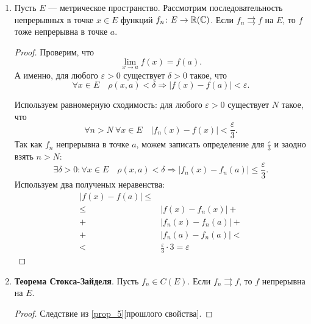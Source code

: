 \begin{prop}
\begin{enumerate}
\begin{proof}
\begin{description}
			Устремим $ m \to  \infty$. Тогда \[
			    \lvert f_n(x) - f(x) \rvert \le  \varepsilon 
			.\] 
			По определению равномерной сходимости получаем, что $ f_n \rightrightarrows f$ на $ E$.
	        \end{description} 
	    \end{proof}
	\item \label{prop_5} Пусть $ E$ --- метрическое пространство. Рассмотрим последовательность непрерывных в точке $ x \in E$ функций $ f_n \colon E \to \mathbb{R}(\mathbb{C}) $. Если $ f_n \rightrightarrows f$ на $ E$, то  $ f$ тоже непрерывна в точке  $ a$.
	     \begin{proof}
	        Проверим, что 
		\[
		    \lim_{x \to  a} f(x) = f(a)
		.\] 
		А именно, для любого $ \varepsilon  > 0$ существует $ \delta > 0$ такое, что
		\[
		    \forall x \in E \quad \rho(x, a) < \delta \Longrightarrow \lvert f(x) - f(a) \rvert  < \varepsilon 
		.\] 

		Используем равномерную сходимость: для любого  $ \varepsilon > 0$ существует $ N$ такое, что
		\[\label{eq:koshi_1}
		    \forall n > N ~ \forall x \in E \quad \lvert f_n(x) - f(x) \rvert  < \frac{\varepsilon}{3}
			.\]
		Так как $ f_n$ непрерывна в точке $ a$, можем записать определение для  $ \frac{\varepsilon}{3}$ и заодно взять $ n > N$:
		\[
		    \exists \delta >0 \colon \forall x \in  E \quad \rho(x, a) < \delta \Longrightarrow \lvert f_n(x) - f_n(a) \rvert \le \frac{\varepsilon}{3}
		.\] 
		Используем два полученых неравенства:
		\begin{align*}
		    \lvert f(x) - f(a) \rvert \le  & \\
					       \le  & \lvert f(x) - f_n(x) \rvert + \\
					       + & \lvert f_n(x) - f_n(a) \rvert + \\
					       + & \lvert f_n(a) - f_n(a) \rvert < \\
					       < & \frac{\varepsilon}{3} \cdot  3 = \varepsilon 
		\end{align*}
	    \end{proof}

	\item {\bf Теорема Стокса-Зайделя}. Пусть $ f_n \in C(E)$. Если $ f_n \rightrightarrows f$, то $ f$ непрерывна на $ E$. 
	    \begin{proof}
		Следствие из \ref{prop_5}[прошлого свойства].
	    \end{proof}
    \end{enumerate}
\end{prop}

